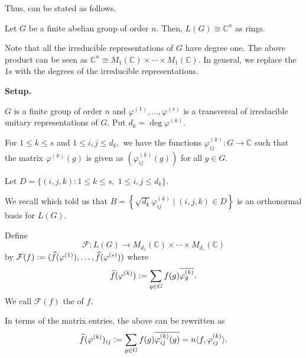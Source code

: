 Thus,  can be stated as follows.
\begin{thm}
    Let $G$ be a finite abelian group of order $n.$ Then, $L(G) \cong \mathbb{C}^n$ as rings.
\end{thm}

Note that all the irreducible representations of $G$ have degree one. The above product can be seen as $\mathbb{C}^n \cong M_1(\mathbb{C}) \times \cdots \times M_1(\mathbb{C}).$ In general, we replace the $1$s with the degrees of the irreducible representations.

\begin{aside}
    \textbf{Setup.}

    $G$ is a finite group of order $n$ and $\varphi^{(1)}, \ldots, \varphi^{(s)}$ is a transversal of irreducible unitary representations of $G.$ Put $d_k = \deg \varphi^{(k)}.$ 

    For $1 \le k \le s$ and $1 \le i, j \le d_k,$ we have the functions $\varphi^{(k)}_{ij} : G \to \mathbb{C}$ such that the matrix $\varphi^{(k)}(g)$ is given as $(\varphi^{(k)}_{ij}(g))$ for all $g \in G.$

    Let $D = \{(i, j, k) : 1 \le k \le s,\; 1 \le i, j \le d_k\}.$

    We recall  which told us that $B = \left\{\sqrt{d_k}\varphi_{ij}^{(k)} \mid (i, j, k) \in D\right\}$ is an orthonormal basis for $L(G).$
\end{aside}

\begin{defn}%
    Define
    \begin{equation*} 
        \mathcal{F} : L(G) \to M_{d_1}(\mathbb{C}) \times \cdots \times M_{d_s}(\mathbb{C})
    \end{equation*}
    by $\mathcal{F}(f) \vcentcolon= (\widehat{f}(\varphi^{(1)}), \ldots, \widehat{f}(\varphi^{(s)}))$ where
    \begin{equation*}
        \widehat{f}(\varphi^{(k)}) \vcentcolon= \sum_{g \in G} f(g)\overline{\varphi^{(k)}_g}.
    \end{equation*}
    We call $\mathcal{F}(f)$ the  of $f.$
\end{defn}
\begin{rem}
    In terms of the matrix entries, the above can be rewritten as
    \begin{equation} \label{eq:012}
        \widehat{f}(\varphi^{(k)})_{ij} \vcentcolon= \sum_{g \in G} f(g)\overline{\varphi^{(k)}_{ij}(g)} = n\langle f, \varphi^{(k)}_{ij}\rangle.
    \end{equation}
\end{rem}

